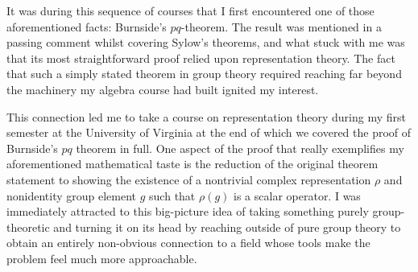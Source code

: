 \documentclass[11pt]{article}
\begin{document}
It was during this sequence of courses that I first encountered one of those aforementioned facts: Burnside's $pq$-theorem. The result was mentioned in a passing comment whilst covering Sylow's theorems, and what stuck with me was that its most straightforward proof relied upon representation theory. The fact that such a simply stated theorem in group theory required reaching far beyond the machinery my algebra course had built ignited my interest.

This connection led me to take a course on representation theory during my first semester at the University of Virginia at the end of which we covered the proof of Burnside's $pq$ theorem in full. One aspect of the proof that really exemplifies my aforementioned mathematical taste is the reduction of the original theorem statement to showing the existence of a nontrivial complex representation $\rho$ and nonidentity group element $g$ such that $\rho(g)$ is a scalar operator. I was immediately attracted to this big-picture idea of taking something purely group-theoretic and turning it on its head by reaching outside of pure group theory to obtain an entirely non-obvious connection to a field whose tools make the problem feel much more approachable.

%
\end{document}
